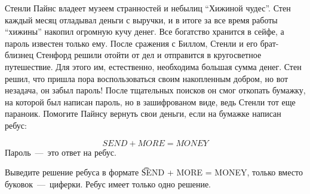 

Стенли Пайнс владеет музеем странностей и небылиц ``Хижиной чудес''. Стен каждый месяц отладывал деньги с выручки, и в итоге за все время работы ``хижины'' накопил огромную кучу денег. Все богатство хранится в сейфе, а пароль известен только ему. После сражения с Биллом, Стенли и его брат-близнец Стенфорд решили отойти от дел и отправится в кругосветное путешествие. Для этого им, естественно, необходима большая сумма денег. Стен решил, что пришла пора воспользоваться своим накопленным добром, но вот незадача, он забыл пароль! После тщательных поисков он смог откопать бумажку, на которой был написан пароль, но в зашифрованом виде, ведь Стенли тот еще параноик. Помогите Пайнсу вернуть свои деньги, если на бумажке написан ребус:

\begin{equation*}
	SEND + MORE = MONEY
\end{equation*} 
Пароль~---~это ответ на ребус.

\OutputFile
Выведите решение ребуса в формате \t{SEND + MORE = MONEY}, только вместо буковок~---~циферки. Ребус имеет только одно решение.



